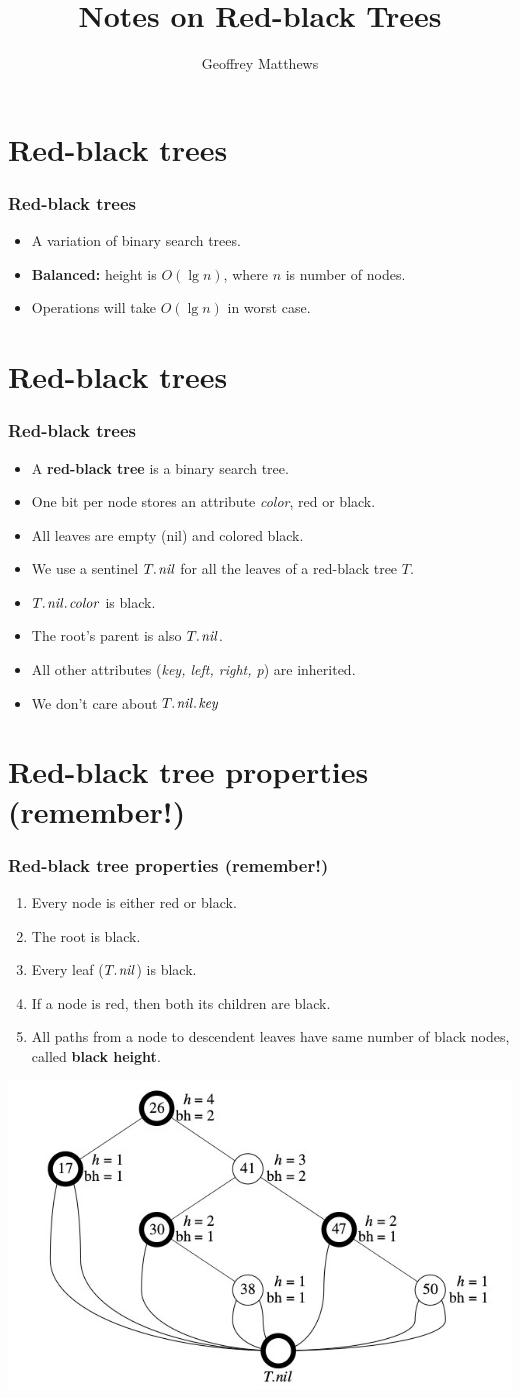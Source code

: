 \documentclass{beamer}
\title{Notes on Red-black Trees}
\author{Geoffrey Matthews}
\newcommand{\bi}{\begin{itemize}}
\newcommand{\ii}{\item}
\newcommand{\ei}{\end{itemize}}
\newcommand{\sect}[1]{
\section{#1}
\begin{frame}[fragile]\frametitle{#1}
}
\begin{document}
\begin{frame}
  \maketitle
\end{frame}


\sect{Red-black trees}
\bi
\ii A variation of binary search trees.
\ii \textbf{Balanced:} height is $O(\lg n)$, where $n$ is number of nodes.
\ii Operations will take $O(\lg n)$ in worst case.
\ei

\end{frame}

\sect{Red-black trees}
\bi
\ii A \textbf{red-black tree} is a binary search tree.
\ii One bit per node stores an attribute \textit{color}, red or black.
\ii All leaves are empty (nil) and colored black.
\ii We use a sentinel $\attrib{T}{nil}$ for all the leaves of a
red-black tree $T$.
\ii $\attrib{\attrib{T}{nil}}{color}$ is black.
\ii The root's parent is also $\attrib{T}{nil}$.
\ii All other attributes ({\em key, left, right, p}) are inherited.
\ii We don't care about $\attrib{\attrib{T}{nil}}{key}$
\ei


\end{frame}

\sect{Red-black tree properties \hspace{3cm} (remember!)}

\begin{enumerate}
  \ii Every node is either red or black.
  \ii The root is black.
  \ii Every leaf ($\attrib{T}{nil}$) is black.
  \ii If a node is red, then both its children are black.
  \ii All paths from a node to descendent leaves
  have same number of black nodes, called {\bf black height}.
\end{enumerate}
\vfill
\includegraphics[scale=0.5]{example}
\end{frame}
\end{document}

